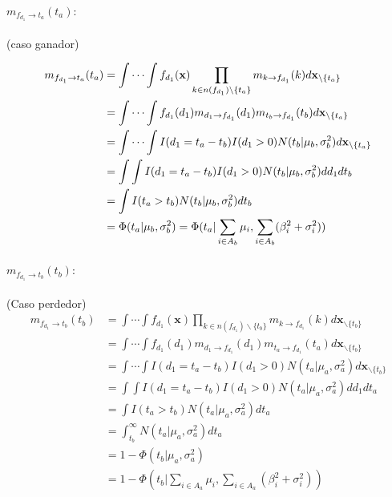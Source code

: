 \documentclass[11pt,twoside,spanish]{report} %
\begin{document}
\paragraph{$m_{f_{d_1}\rightarrow t_a}(t_a):$} (caso ganador)

\begin{equation}
	\centering
	\begin{split}
		m_{f_{d_1}\rightarrow t_a}(t_a) & = \int\cdots\int f_{d_1}(\textbf{x})\prod_{k\in n(f_{d_1})\backslash\{t_a\}} m_{k\rightarrow f_{d_1}}(k)d\textbf{x}_{\backslash \{t_a\}} \\
		& = \int\cdots\int f_{d_1}(d_1)m_{d_1\rightarrow f_{d_1}}(d_1)m_{t_b\rightarrow f_{d_1}}(t_b)d\textbf{x}_{\backslash\{t_a\}}\\
		& = \int\cdots\int I(d_1=t_a-t_b)I(d_1>0)N(t_b \vert \mu_b,\sigma_b^2)d\textbf{x}_{\backslash\{t_a\}}\\
		& =\int\int  I(d_1=t_a-t_b)I(d_1>0)N(t_b \vert \mu_b,\sigma_b^2)dd_1dt_b\\
		& =\int I(t_a>t_b)N(t_b \vert \mu_b,\sigma_b^2)dt_b\\
		& = \Phi(t_a \vert \mu_b,\sigma_b^2)=  \Phi(t_a \vert \sum_{i\in A_b}\mu_i,\sum_{i\in A_b}(\beta_i^2+\sigma_i^2))
	\end{split}
\end{equation}



\paragraph{$m_{f_{d_1} \rightarrow t_b}(t_b):$} (Caso perdedor)
\begin{equation}
	\begin{split}
		m_{f_{d_1}\rightarrow t_b}(t_b) & = \int\cdots\int f_{d_1}(\textbf{x})\prod_{k\in n(f_{d_1})\backslash\{t_b\}} m_{k\rightarrow f_{d_1}}(k)d\textbf{x}_{\backslash \{t_b\}} \\
		& = \int\cdots\int f_{d_1}(d_1)m_{d_1\rightarrow f_{d_1}}(d_1)m_{t_a\rightarrow f_{d_1}}(t_a)d\textbf{x}_{\backslash\{t_b\}}\\
		& = \int\cdots\int I(d_1=t_a-t_b)I(d_1>0)N(t_a \vert \mu_a,\sigma_a^2)d\textbf{x}_{\backslash\{t_b\}}\\
		& =\int\int  I(d_1=t_a-t_b)I(d_1>0)N(t_a \vert \mu_a,\sigma_a^2)dd_1dt_a\\
		& =\int I(t_a>t_b)N(t_a \vert \mu_a,\sigma_a^2)dt_a\\
		& =\int_{t_b}^{\infty}N(t_a \vert \mu_a,\sigma_a^2)dt_a\\
		& = 1 - \Phi(t_b \vert \mu_a,\sigma_a^2) \\
		& =  1- \Phi(t_b \vert \sum_{i\in A_a}\mu_i,\sum_{i\in A_a}(\beta_i^2+\sigma_i^2))
	\end{split}
\end{equation}
\end{document}
